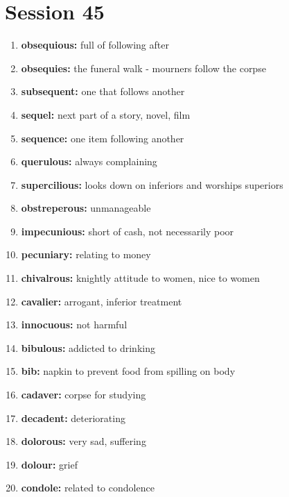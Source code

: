 \documentclass{article}
\begin{document}
\section{Session 45}
\begin{enumerate}
    \item \textbf{obsequious: }{full of following after}
    \item \textbf{obsequies: }{the funeral walk - mourners follow the corpse}
    \item \textbf{subsequent: }{one that follows another}
    \item \textbf{sequel: }{next part of a story, novel, film}
    \item \textbf{sequence: }{one item following another}
    \item \textbf{querulous: }{always complaining}
    \item \textbf{supercilious: }{looks down on inferiors and worships superiors}
    \item \textbf{obstreperous: }{unmanageable}
    \item \textbf{impecunious: }{short of cash, not necessarily poor}
    \item \textbf{pecuniary: }{relating to money}
    \item \textbf{chivalrous: }{knightly attitude to women, nice to women}
    \item \textbf{cavalier: }{arrogant, inferior treatment}
    \item \textbf{innocuous: }{not harmful}
    \item \textbf{bibulous: }{addicted to drinking}
    \item \textbf{bib: }{napkin to prevent food from spilling on body}
    \item \textbf{cadaver: }{corpse for studying}
    \item \textbf{decadent: }{deteriorating}
    \item \textbf{dolorous: }{very sad, suffering}
    \item \textbf{dolour: }{grief}
    \item \textbf{condole: }{related to condolence}
    
\end{enumerate}
\end{document}
